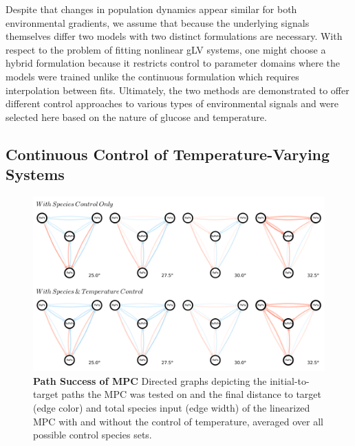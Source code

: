 \documentclass[twocolumn, 10pt]{report}
\begin{document}
{Despite that changes in population dynamics appear similar for both environmental gradients, we assume that because the underlying signals themselves differ two models with two distinct formulations are necessary. With respect to the problem of fitting nonlinear gLV systems, one might choose a hybrid formulation because it restricts control to parameter domains where the models were trained unlike the continuous formulation which requires interpolation between fits. Ultimately, the two methods are demonstrated to offer different control approaches to various types of environmental signals and were selected here based on the nature of glucose and temperature.

\subsection*{Continuous Control of Temperature-Varying Systems}

\begin{figure}[!htb]
    \centering
    \includegraphics[width=2.0\columnwidth]{figs/MPC_Paths_Figure_Ricatti_hq.png}
    \centering
    \caption{\textbf{Path Success of MPC} Directed graphs depicting the initial-to-target paths the MPC was tested on and the final distance to target (edge color) and total species input (edge width) of the linearized MPC with and without the control of temperature, averaged over all possible control species sets. }\label{fig:mpc_paths}
\end{figure}

}
\end{document}

